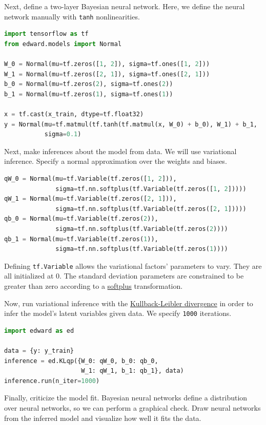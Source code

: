Next, define a two-layer Bayesian neural network. Here, we
define the neural network manually with \texttt{tanh} nonlinearities.

\begin{lstlisting}[language=Python]
import tensorflow as tf
from edward.models import Normal

W_0 = Normal(mu=tf.zeros([1, 2]), sigma=tf.ones([1, 2]))
W_1 = Normal(mu=tf.zeros([2, 1]), sigma=tf.ones([2, 1]))
b_0 = Normal(mu=tf.zeros(2), sigma=tf.ones(2))
b_1 = Normal(mu=tf.zeros(1), sigma=tf.ones(1))

x = tf.cast(x_train, dtype=tf.float32)
y = Normal(mu=tf.matmul(tf.tanh(tf.matmul(x, W_0) + b_0), W_1) + b_1,
           sigma=0.1)
\end{lstlisting}

Next, make inferences about the model from data. We will use variational
inference. Specify a normal approximation over the weights and biases.

\begin{lstlisting}[language=Python]
qW_0 = Normal(mu=tf.Variable(tf.zeros([1, 2])),
              sigma=tf.nn.softplus(tf.Variable(tf.zeros([1, 2]))))
qW_1 = Normal(mu=tf.Variable(tf.zeros([2, 1])),
              sigma=tf.nn.softplus(tf.Variable(tf.zeros([2, 1]))))
qb_0 = Normal(mu=tf.Variable(tf.zeros(2)),
              sigma=tf.nn.softplus(tf.Variable(tf.zeros(2))))
qb_1 = Normal(mu=tf.Variable(tf.zeros(1)),
              sigma=tf.nn.softplus(tf.Variable(tf.zeros(1))))
\end{lstlisting}

Defining \texttt{tf.Variable} allows the variational factors'
parameters to vary. They are all initialized at 0. The standard
deviation parameters are constrained to be greater than zero according
to a
\href{https://en.wikipedia.org/wiki/Rectifier_(neural_networks)}{softplus}
transformation.

Now, run variational inference with the
\href{https://en.wikipedia.org/wiki/Kullback–Leibler_divergence}{Kullback-Leibler divergence}
in order to infer the model's latent variables given data.
We specify \texttt{1000} iterations.
\begin{lstlisting}[language=Python]
import edward as ed

data = {y: y_train}
inference = ed.KLqp({W_0: qW_0, b_0: qb_0,
                     W_1: qW_1, b_1: qb_1}, data)
inference.run(n_iter=1000)
\end{lstlisting}

Finally, criticize the model fit. Bayesian neural networks define a distribution
over neural networks, so we can perform a graphical check. Draw neural networks
from the inferred model and visualize how well it fits the data.

